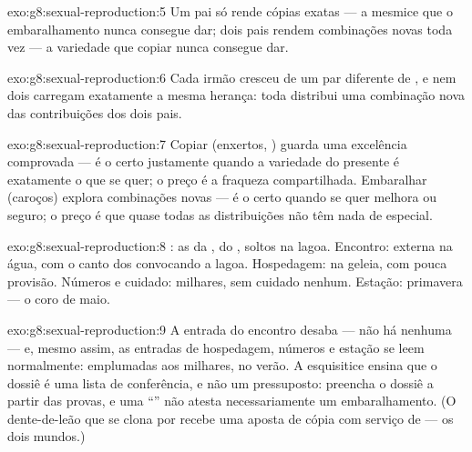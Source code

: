 \begin{solution}{exo:g8:sexual-reproduction:5}
Um pai só rende cópias exatas --- a mesmice que o embaralhamento nunca
consegue dar; dois pais rendem combinações novas toda vez --- a
variedade que copiar nunca consegue dar.
\end{solution}

\begin{solution}{exo:g8:sexual-reproduction:6}
Cada irmão cresceu de um par diferente de , e nem dois 
carregam exatamente a mesma herança: toda  distribui uma
combinação nova das contribuições dos dois pais.
\end{solution}

\begin{solution}{exo:g8:sexual-reproduction:7}
Copiar (enxertos, ) guarda uma excelência comprovada --- é o
certo justamente quando a variedade do presente é exatamente o que se
quer; o preço é a fraqueza compartilhada. Embaralhar (caroços) explora
combinações novas --- é o certo quando se quer melhora ou seguro; o
preço é que quase todas as distribuições não têm nada de especial.
\end{solution}

\begin{solution}{exo:g8:sexual-reproduction:8}
: as  da ,  do , soltos na lagoa.
Encontro:  externa na água, com o canto dos 
convocando a lagoa. Hospedagem:  na geleia, com pouca provisão.
Números e cuidado: milhares, sem cuidado nenhum. Estação: primavera ---
o coro de maio.
\end{solution}

\begin{solution}{exo:g8:sexual-reproduction:9}
A entrada do encontro desaba --- não há  nenhuma --- e, mesmo
assim, as entradas de hospedagem, números e estação se leem
normalmente:  emplumadas aos milhares, no verão. A esquisitice
ensina que o dossiê é uma lista de conferência, e não um pressuposto:
preencha o dossiê a partir das provas, e uma ``'' não atesta
necessariamente um embaralhamento. (O dente-de-leão que se clona por
 recebe uma aposta de cópia com serviço de  --- os dois
mundos.)
\end{solution}

